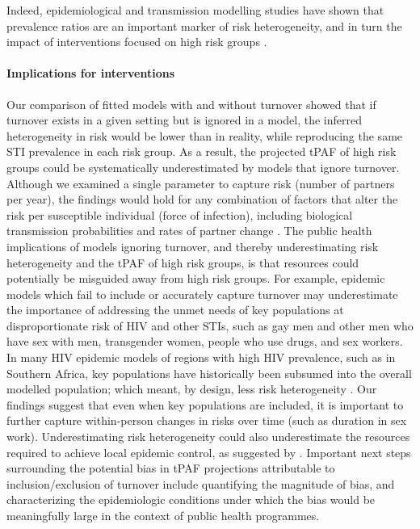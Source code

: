 Indeed, epidemiological and transmission modelling studies have shown that prevalence ratios
are an important marker of risk heterogeneity, and in turn
the impact of interventions focused on high risk groups \citep{Baral2012,Mishra2012}.
\paragraph{Implications for interventions}
Our comparison of fitted models with and without turnover showed that
if turnover exists in a given setting but is ignored in a model,
the inferred heterogeneity in risk would be lower than in reality,
while reproducing the same STI prevalence in each risk group.
As a result, the projected tPAF of high risk groups
could be systematically underestimated by models that ignore turnover.
Although we examined a single parameter to capture risk
(number of partners per year),
the findings would hold for any combination of factors
that alter the risk per susceptible individual (force of infection), including
biological transmission probabilities and rates of partner change \citep{Anderson1991}.
The public health implications of models ignoring turnover,
and thereby underestimating risk heterogeneity and the tPAF of high risk groups,
is that resources could potentially be misguided away from high risk groups.
For example, epidemic models which fail to include or accurately capture
turnover may underestimate the importance of addressing the unmet
needs of key populations at disproportionate risk of HIV and other STIs, such as
gay men and other men who have sex with men, transgender women, people who use drugs, and sex workers.
In many HIV epidemic models of regions with high HIV prevalence, such as in Southern Africa,
key populations have historically been subsumed into the overall modelled population;
which meant, by design, less risk heterogeneity \citep{Eaton2012,Cori2014,Mishra2016}.
Our findings suggest that even when key populations are included, it is important to
further capture within-person changes in risks over time (such as duration in sex work).
Underestimating risk heterogeneity could also underestimate the resources
required to achieve local epidemic control, as suggested by \citet{Henry2015,Hontelez2013}.
Important next steps surrounding the potential bias in tPAF projections
attributable to inclusion/exclusion of turnover include
quantifying the magnitude of bias,
and characterizing the epidemiologic conditions under which the bias
would be meaningfully large in the context of public health programmes.
